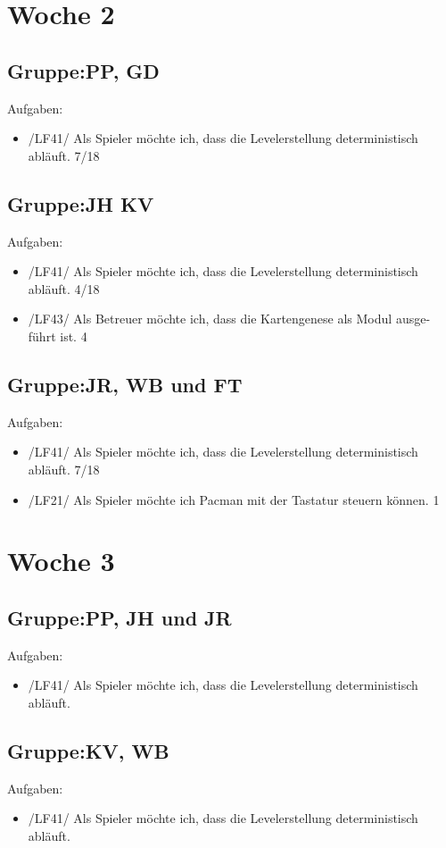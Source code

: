 \documentclass[11pt,a4paper]{article}
\begin{document}
\section*{Woche 2}

\subsection*{Gruppe:PP, GD}
Aufgaben:
\begin{itemize}
\item /LF41/ Als Spieler möchte ich, dass die Levelerstellung deterministisch abläuft. 7/18
\end{itemize} 
\subsection*{Gruppe:JH KV}
Aufgaben:
\begin{itemize}
\item /LF41/ Als Spieler möchte ich, dass die Levelerstellung deterministisch abläuft. 4/18
\item /LF43/ Als Betreuer möchte ich, dass die Kartengenese als Modul ausge-
führt ist. 4
\end{itemize}
\subsection*{Gruppe:JR, WB und FT}
Aufgaben:
\begin{itemize}
\item /LF41/ Als Spieler möchte ich, dass die Levelerstellung deterministisch abläuft. 7/18
\item /LF21/ Als Spieler möchte ich Pacman mit der Tastatur steuern können. 1
\end{itemize} 


\section*{Woche 3}
\subsection*{Gruppe:PP, JH und JR}
Aufgaben:
\begin{itemize}
\item /LF41/ Als Spieler möchte ich, dass die Levelerstellung deterministisch abläuft.  
\end{itemize}

\subsection*{Gruppe:KV, WB}
Aufgaben:
\begin{itemize}
\item  /LF41/ Als Spieler möchte ich, dass die Levelerstellung deterministisch abläuft.

\end{itemize}
\end{document}
